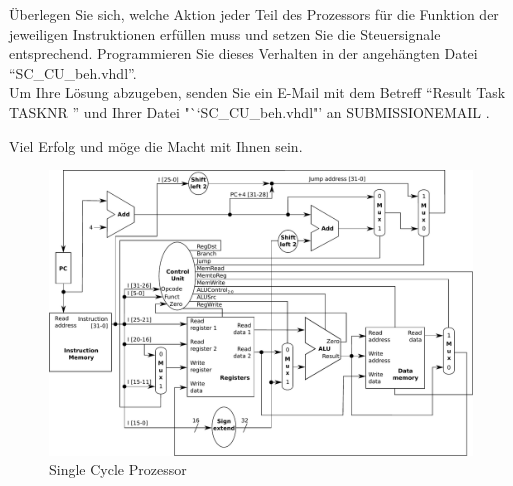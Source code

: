 \documentclass[a4paper,12pt]{article}
\begin{document}
\"Uberlegen Sie sich, welche Aktion jeder Teil des Prozessors f\"ur die Funktion der jeweiligen Instruktionen erf\"ullen muss und setzen Sie die Steuersignale entsprechend. Programmieren Sie dieses Verhalten in der angeh\"angten Datei "`SC\_CU\_beh.vhdl"'.\\

Um Ihre L\"osung abzugeben, senden Sie ein E-Mail mit dem Betreff "`Result Task {{ TASKNR }}"' und Ihrer Datei "``SC\_CU\_beh.vhdl"'  an {{ SUBMISSIONEMAIL }}.

\vspace{0.5cm}

Viel Erfolg und m\"oge die Macht mit Ihnen sein.

\begin{landscape}
\begin{figure}[!h]
\vspace{-0.5cm}
\hspace{-1.8cm}
\includegraphics[width=25.5cm]{../static/Single_Cycle_Processor_V_3_0}%
\caption{Single Cycle Prozessor}
\label{fig:SingleCycleProcessor}
\end{figure}
\end{landscape}
\end{document}
